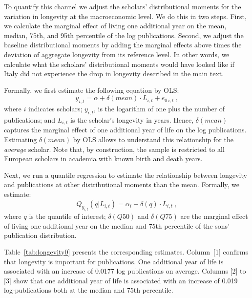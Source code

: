 To quantify this channel we adjust the scholars' distributional moments for the variation in longevity at the macroeconomic level.
We do this in two steps. First, we calculate the marginal effect of living one additional year on the mean, median, 75th, and 95th percentile of the log publications.
Second, we adjust the baseline distributional moments by adding the marginal effects above times the deviation of aggregate longevity from its reference level.
In other words, we calculate what the scholars' distributional moments would have looked like if Italy did not experience the drop in longevity described in the main text.


Formally, we first estimate the following equation by OLS:
\begin{equation}  \label{eq:long0}
	y_{i,t} = \alpha + \delta(mean) \cdot L_{i,t} + e_{0 \ i,t} \ ,
\end{equation}
where $i$ indicates scholars; $y_{i,t}$, is the logarithm of one plus the number of publications; and $L_{i,t}$ is the scholar's longevity in years.
Hence, $\delta(mean)$ captures the marginal effect of one additional year of life on the log publications. Estimating $\delta(mean)$ by OLS allows to
understand this relationship for the \textit{average} scholar.
Note that, by construction, the sample is restricted to all European scholars in academia with known birth and death years.

Next, we run a quantile regression to estimate the relationship between longevity and publications at other distributional moments than the mean. Formally, we estimate:
\begin{equation}  \label{eq:long2}
	Q_{y_{i,t}}(q | L_{i,t}) = \alpha_i + \delta(q) \cdot L_{i,t} \ ,
\end{equation}
where $q$ is the quantile of interest; $\delta(Q50)$ and $\delta(Q75)$ are the marginal effect of living one additional year on the median and
75th percentile of the sons' publication distribution. 

Table~\ref{tab:longevity0} presents the corresponding estimates. Column~[1] confirms that longevity is important for publications.
One additional year of life is associated with an increase of 0.0177 log publications on average.
Columns [2] to [3] show that one additional year of life is associated with an increase of 0.019 log-publications both at the median and 75th percentile.

